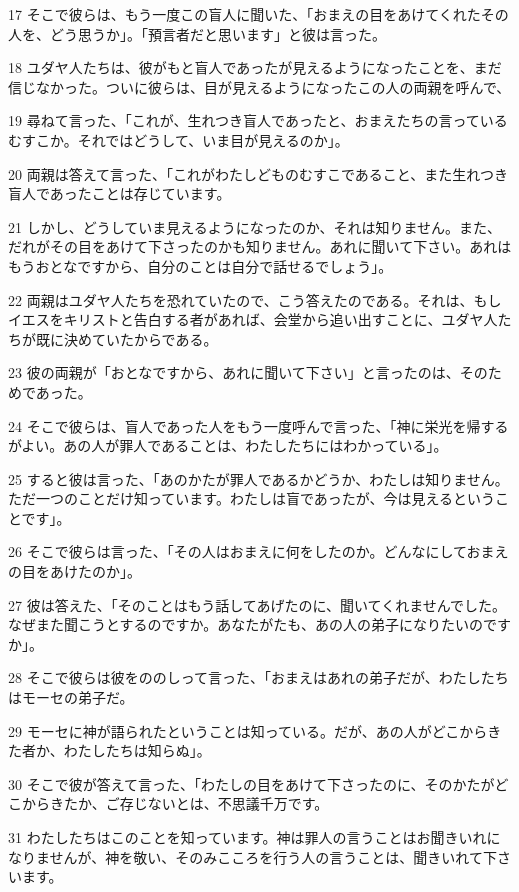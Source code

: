 \par 17 そこで彼らは、もう一度この盲人に聞いた、「おまえの目をあけてくれたその人を、どう思うか」。「預言者だと思います」と彼は言った。
\par 18 ユダヤ人たちは、彼がもと盲人であったが見えるようになったことを、まだ信じなかった。ついに彼らは、目が見えるようになったこの人の両親を呼んで、
\par 19 尋ねて言った、「これが、生れつき盲人であったと、おまえたちの言っているむすこか。それではどうして、いま目が見えるのか」。
\par 20 両親は答えて言った、「これがわたしどものむすこであること、また生れつき盲人であったことは存じています。
\par 21 しかし、どうしていま見えるようになったのか、それは知りません。また、だれがその目をあけて下さったのかも知りません。あれに聞いて下さい。あれはもうおとなですから、自分のことは自分で話せるでしょう」。
\par 22 両親はユダヤ人たちを恐れていたので、こう答えたのである。それは、もしイエスをキリストと告白する者があれば、会堂から追い出すことに、ユダヤ人たちが既に決めていたからである。
\par 23 彼の両親が「おとなですから、あれに聞いて下さい」と言ったのは、そのためであった。
\par 24 そこで彼らは、盲人であった人をもう一度呼んで言った、「神に栄光を帰するがよい。あの人が罪人であることは、わたしたちにはわかっている」。
\par 25 すると彼は言った、「あのかたが罪人であるかどうか、わたしは知りません。ただ一つのことだけ知っています。わたしは盲であったが、今は見えるということです」。
\par 26 そこで彼らは言った、「その人はおまえに何をしたのか。どんなにしておまえの目をあけたのか」。
\par 27 彼は答えた、「そのことはもう話してあげたのに、聞いてくれませんでした。なぜまた聞こうとするのですか。あなたがたも、あの人の弟子になりたいのですか」。
\par 28 そこで彼らは彼をののしって言った、「おまえはあれの弟子だが、わたしたちはモーセの弟子だ。
\par 29 モーセに神が語られたということは知っている。だが、あの人がどこからきた者か、わたしたちは知らぬ」。
\par 30 そこで彼が答えて言った、「わたしの目をあけて下さったのに、そのかたがどこからきたか、ご存じないとは、不思議千万です。
\par 31 わたしたちはこのことを知っています。神は罪人の言うことはお聞きいれになりませんが、神を敬い、そのみこころを行う人の言うことは、聞きいれて下さいます。
